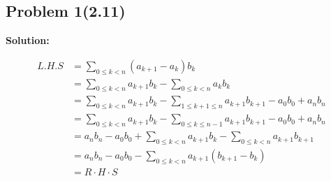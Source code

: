 \subsection{Problem 1(2.11)}
\begin{flushleft}
\textbf{Solution: }
\par
$$
\begin{aligned}
L . H . S & =\sum_{0 \leq k<n}\left(a_{k+1}-a_k\right) b_k \\
& =\sum_{0 \leq k<n} a_{k+1} b_k-\sum_{0 \leq k<n} a_k b_k \\
& =\sum_{0 \leq k<n} a_{k+1} b_k-\sum_{1 \leq k+1 \leq n} a_{k+1} b_{k+1} -a_0b_0  + a_nb_n\\
& =\sum_{0 \leq k<n} a_{k+1} b_k-\sum_{0 \leq k \leq n-1} a_{k+1} b_{k+1}-a_0b_0 + a_nb_n \\
& =a_n b_n-a_0 b_0+\sum_{0 \leq k<n} a_{k+1} b_k-\sum_{0 \leq k<n} a_{k+1} b_{k+1}\\
& =a_n b_n-a_0 b_0-\sum_{0 \leq k<n} a_{k+1}\left(b_{k+1}-b_k\right)\\
& =R \cdot H \cdot S
\end{aligned}
$$

\end{flushleft}